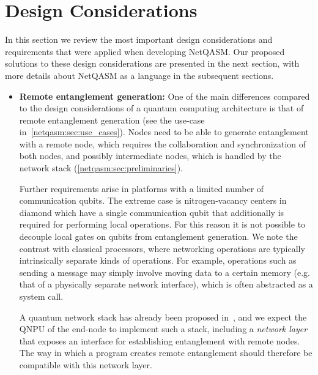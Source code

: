 \section{Design Considerations}
\label{netqasm:sec:design_considerations}
In this section we review the most important design considerations and requirements that were applied when
developing \ac{NetQASM}.
Our proposed solutions to these design considerations are presented in the next section, with more details about \ac{NetQASM} as a language
in the subsequent sections.

\begin{itemize}
      \item \label{item:design_ent_gen} \textbf{Remote entanglement generation:}
            One of the main differences compared to the design considerations of a quantum computing architecture is that of remote entanglement
            generation (see the use-case in~\cref{netqasm:sec:use_cases}).
            Nodes need to be able to generate entanglement with a remote node, which requires the collaboration and synchronization of both nodes, and possibly intermediate nodes, which is handled by the network stack (\cref{netqasm:sec:preliminaries}).

            Further requirements arise in platforms with a limited number of communication qubits.
            The extreme case is nitrogen-vacancy centers in diamond which have a single communication qubit that additionally is required for performing local operations.
            For this reason it is not possible to decouple local gates on qubits from entanglement
            generation.
            We note the contrast with classical processors, where networking operations are typically intrinsically separate kinds of operations.
            For example, operations such as sending a message may simply involve moving data to a certain memory (e.g. that of a physically separate network interface), which is often abstracted as a system call.

            A quantum network stack has already been proposed in~\cite{dahlberg2019linklayer,kozlowski2020networklayer}, and we expect the \ac{QNPU} of the end-node to implement such a stack, including a \textit{network layer} that exposes an interface for establishing entanglement with remote nodes.
            The way in which a program creates remote entanglement should therefore be compatible with this network layer.


\end{itemize}

